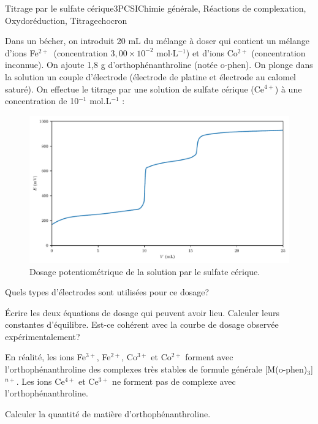 \begin{exercise}{Titrage par le sulfate cérique}{3}{PCSI}{Chimie générale, Réactions de complexation, Oxydoréduction, Titrage}{chocron}

Dans un bécher, on introduit 20 mL du mélange à doser qui contient un mélange d'ions Fe$^{2+}$~(concentration $3,00 \times 10^{-2}$ mol$\cdot$L$^{-1}$) et d'ions Co$^{2+}$ (concentration inconnue). On ajoute 1,8 g d'orthophénanthroline (notée o-phen). 
On plonge dans la solution un couple d'électrode (électrode de platine et électrode au calomel saturé).
On effectue le titrage par une solution de sulfate cérique (Ce$^{4+}$) à une concentration de 10$^{-1}$ mol.L$^{-1}$ :
\begin{figure}[H]
    \centering
    \includegraphics[width=\linewidth]{chimiePC/gene/dosage_ophen.pdf}\vspace{-1em}
    \caption{Dosage potentiométrique de la solution par le sulfate cérique.}
\end{figure}

\begin{questions}
\questioncours Quels types d'électrodes sont utilisées pour ce dosage?

\question Écrire les deux équations de dosage qui peuvent avoir lieu. Calculer leurs constantes d'équilibre. Est-ce cohérent avec la courbe de dosage observée expérimentalement?

\begin{EnvUplevel}
En réalité, les ions Fe$^{3+}$, Fe$^{2+}$, Co$^{3+}$ et Co$^{2+}$ forment avec l'orthophénanthroline des complexes très stables de formule générale [M(o-phen)$_3$]$^{n+}$.
Les ions Ce$^{4+}$ et Ce$^{3+}$ ne forment pas de complexe avec l'orthophénanthroline.  

\end{EnvUplevel}
\question Calculer la quantité de matière d'orthophénanthroline. 


\end{questions}
\end{exercise}
